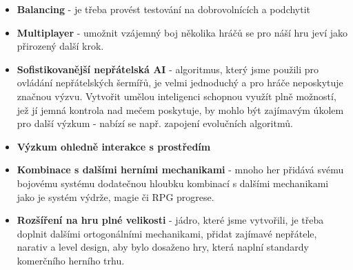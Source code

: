 \begin{itemize}
    \item \textbf{Balancing} - je třeba provést testování na dobrovolnících a podchytit 
    \item \textbf{Multiplayer} - umožnit vzájemný boj několika hráčů se pro náší hru jeví jako přirozený další krok.  
    \item \textbf{Sofistikovanější nepřátelská AI} - algoritmus, který jsme použili pro ovládání nepřátelských šermířů, je velmi jednoduchý a pro hráče neposkytuje značnou výzvu. Vytvořit umělou inteligenci schopnou využít plně možností, jež jí jemná kontrola nad mečem poskytuje, by mohlo být zajímavým úkolem pro další výzkum - nabízí se např. zapojení evolučních algoritmů.
    \item \textbf{Výzkum ohledně interakce s prostředím}
    \item \textbf{Kombinace s dalšími herními mechanikami} - mnoho her přidává svému bojovému systému dodatečnou hloubku kombinací s dalšími mechanikami jako je systém výdrže, magie či \acs{RPG} progrese.
    \item \textbf{Rozšíření na hru plné velikosti} - jádro, které jsme vytvořili, je třeba doplnit dalšími ortogonálními mechanikami, přidat zajímavé nepřátele, narativ a level design, aby bylo dosaženo hry, která naplní standardy komerčního herního trhu. 
\end{itemize}